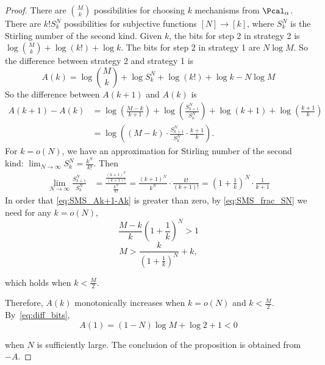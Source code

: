 \propSMS*
\begin{proof}
    There are $\binom{M}{k}$ possibilities for choosing $k$ mechanisms from $\Pcal_\alpha$. There are $k! S_k^N$ possibilities for subjective functions $[N]\to [k]$, where $S_k^N$ is the Stirling number of the second kind. Given $k$, the bits for step 2 in strategy 2 is $\log\binom{M}{k} + \log (k!) + \log k$. The bits for step 2 in strategy 1 are $N\log M$. So the difference between strategy 2 and strategy 1 is
    \begin{equation}\label{eq:diff_bits}
        A(k)=\log\binom{M}{k} + \log S_k^N + \log (k!) + \log k -N\log M
    \end{equation}
    So the difference between $A(k+1)$ and $A(k)$ is
    \begin{align}
        A(k+1) - A(k) &= \log \left( \frac{M - k}{k + 1} \right) + \log \left( \frac{S_{k+1}^N}{S_k^N} \right) + \log (k+1) + \log \left( \frac{k+1}{k} \right)\\
        &= \log \left( (M - k) \cdot \frac{S_{k+1}^N}{S_k^N} \cdot \frac{k+1}{k} \right).\label{eq:SMS_Ak+1-Ak}
    \end{align}
    For $k=o(N)$, we have an approximation for Stirling number of the second kind: $\lim_{N\to \infty} S_k^N= \frac{k^N}{k!}$. Then
    \begin{align}
        \lim_{N\to \infty}\frac{S_{k+1}^N}{S_k^N} &=\frac{\frac{(k+1)^N}{(k+1)!}}{\frac{k^N}{k!}} = \frac{(k+1)^N}{k^N} \cdot \frac{k!}{(k+1)!} = \left(1 + \frac{1}{k}\right)^N \cdot \frac{1}{k + 1}\label{eq:SMS_frac_SN}
    \end{align}
In order that \cref{eq:SMS_Ak+1-Ak} is greater than zero, by \cref{eq:SMS_frac_SN} we need for any $k= o(N)$,
    \begin{equation}
        \frac{M-k}{k} \left(1+\frac{1}{k}\right)^N>1
    \end{equation}
    \begin{equation}\label{eq:SMS_k<k0}
        M>\frac{k}{\left(1+\frac{1}{k}\right)^N}+k,
    \end{equation}

    which holds when $k<\frac{M}{2}$.
    
    Therefore, $A(k)$ monotonically increases when $k=o(N)$ and $k<\frac{M}{2}$. By~\cref{eq:diff_bits}, 
    \begin{equation}
        A(1) = (1-N)\log M + \log 2 +1<0
    \end{equation}

    when $N$ is sufficiently large. The conclusion of the proposition is obtained from $-A$.
\end{proof}

